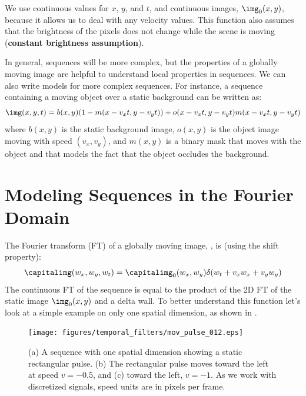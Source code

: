 We use continuous values for $x$, $y$, and $t$, and continuous images, $\img_0(x,y)$,  because it allows us to deal with any velocity values. This function also assumes that the brightness of the pixels does not change while the scene is moving ({\bf constant brightness assumption}). 


In general, sequences will be more complex, but the properties of a globally moving image are helpful to understand local properties in sequences. We can also write models for more complex sequences. For instance, a sequence containing a moving object over a static background can be written as: 
\begin{equation}
\img (x,y,t) = b(x,y) (1-m(x-v_xt,y-v_yt)) + o(x-v_xt,y-v_yt) m(x-v_x t,y-v_y t)
\end{equation}
where $b(x,y)$ is the static background image, $o(x,y)$ is the object image moving with speed $(v_x,v_y)$, and $m(x,y)$ is a binary mask that moves with the object and that models the fact that the object occludes the background. 

\section{Modeling Sequences in the Fourier Domain}
\label{section:Modeling_sequences_in_the_Fourier_domain}

The Fourier transform (FT) of a globally moving image, \eqn{\ref{eq:globaly_moving_image}}, is (using the shift property):
\begin{equation}
\capitalimg (w_x,w_y,w_t) = \capitalimg_0 (w_x, w_y) \delta (w_t + v_x w_x + v_y w_y)
\end{equation}
The continuous FT of the sequence is equal to the product of the 2D FT of the static image $\img_0(x,y)$ and a delta wall. To better understand this function let's look at a simple example on only one spatial dimension, as shown in \fig{\ref{fig:mov_pulse_012}}. 

\begin{figure}[t]
\texttt{[image: figures/temporal\_filters/mov\_pulse\_012.eps]}
\caption{(a) A sequence with one spatial dimension showing a static rectangular pulse. (b) The rectangular pulse moves toward the left at speed $v=-0.5$, and (c) toward the left, $v=-1$. As we work with discretized signals, speed units are in pixels per frame.} 
\label{fig:mov_pulse_012}
\end{figure}

